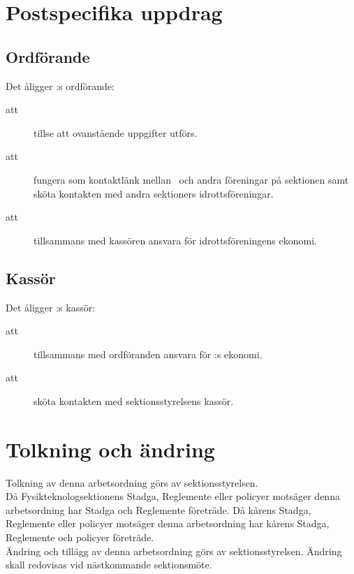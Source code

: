 \section{Postspecifika uppdrag}

\subsection{Ordförande}
Det åligger \forening:s ordförande:
    \begin{description}
      \item[att] tillse att ovanstående uppgifter utförs.
      \item[att] fungera som kontaktlänk mellan \forening \ och andra
      föreningar på sektionen samt sköta kontakten med andra
      sektioners idrotts\-före\-ning\-ar.
      \item[att] tillsammans med kassören ansvara för idrottsföreningens ekonomi.
    \end{description}

\subsection{Kassör}
Det åligger \forening:s kassör:
    \begin{description}
      \item[att] tillsammans med ordföranden ansvara för \forening:s ekonomi.
      \item[att] sköta kontakten med sektionsstyrelsens kassör.
    \end{description}


\section{Tolkning och ändring}
Tolkning av denna arbetsordning görs av sektionsstyrelsen.\\ Då Fysikteknologsektionens Stadga, Reglemente eller policyer motsäger denna arbetsordning har Stadga och Reglemente företräde. Då kårens Stadga, Reglemente eller policyer motsäger denna arbetsordning har kårens Stadga, Reglemente och policyer företräde.\\
Ändring och tillägg av denna arbetsordning görs av sektionsstyrelsen. Ändring skall redovisas vid nästkommande sektionsmöte. 

\newpage
